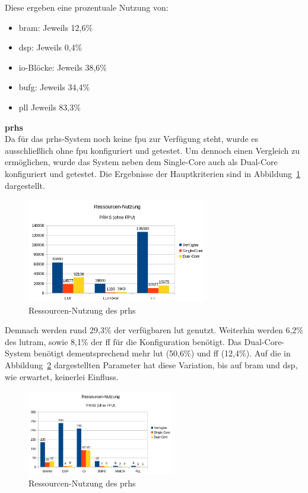 Diese ergeben eine prozentuale Nutzung von:\\
\begin{itemize}
  \item \ac{bram}: Jeweils 12,6\%
  \item \ac{dsp}: Jeweils 0,4\%
  \item \ac{io}-Blöcke: Jeweils 38,6\%
  \item \ac{bufg}: Jeweils 34,4\%
  \item \ac{pll} Jeweils 83,3\%
\end{itemize}

\newpage
\textbf{\acl{prhs}}\\

Da für das \ac{prhs}-System noch keine \ac{fpu} zur Verfügung steht, wurde es ausschließlich ohne \ac{fpu} konfiguriert und getestet.
Um dennoch einen Vergleich zu ermöglichen, wurde das System neben dem Single-Core auch als Dual-Core konfiguriert und getestet.
Die Ergebnisse der Hauptkriterien sind in Abbildung~\ref{fig:ressourcenprhs1} dargestellt.\\

\begin{figure}[H]
\centering
\includegraphics[width=0.7\textwidth]{Hauptteil/ressourcenprhs1.png}
\caption{Ressourcen-Nutzung des \ac{prhs}}
\label{fig:ressourcenprhs1}
\end{figure}

Demnach werden rund 29,3\% der verfügbaren \ac{lut} genutzt. Weiterhin werden 6,2\% des \ac{lutram}, sowie 8,1\% der \ac{ff} für die Konfiguration benötigt.
Das Dual-Core-System benötigt dementsprechend mehr \ac{lut} (50,6\%) und \ac{ff} (12,4\%).
 Auf die in Abbildung~\ref{fig:ressourcenprhs2} dargestellten Parameter hat diese Variation, bis auf \ac{bram} und \ac{dsp}, wie erwartet, keinerlei Einfluss.\\

\begin{figure}[H]
\centering
\includegraphics[width=0.57\textwidth]{Hauptteil/ressourcenprhs2.png}
\caption{Ressourcen-Nutzung des \ac{prhs}}
\label{fig:ressourcenprhs2}
\end{figure}


